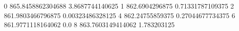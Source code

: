 0 865.8458862304688 3.8687744140625
1 862.6904296875 0.71331787109375
2 861.9803466796875 0.00323486328125
4 862.24755859375 0.27044677734375
6 861.9771118164062 0.0
8 863.7603149414062 1.783203125
